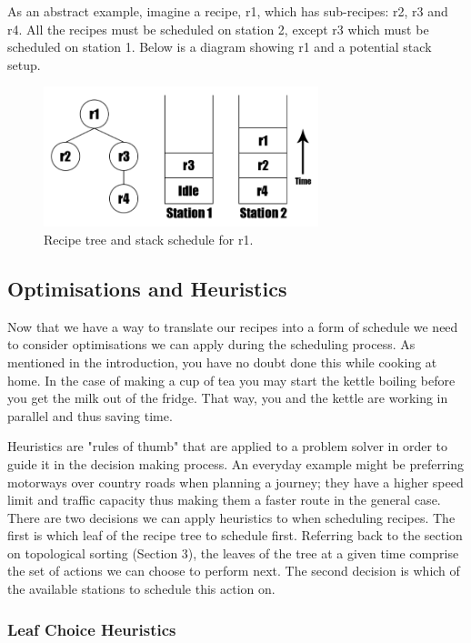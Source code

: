 \documentclass[11pt]{article}
\begin{document}
\medbreak

As an abstract example, imagine a recipe, r1, which has sub-recipes: r2, r3 and r4. All the
recipes must be scheduled on station 2, except r3 which must be scheduled on station 1.
Below is a diagram showing r1 and a potential stack setup.

\begin{figure}[h]
\includegraphics[width=8cm, keepaspectratio]{stacks.png}
\centering
\caption{Recipe tree and stack schedule for r1.}
\end{figure}

\subsection{Optimisations and Heuristics}

Now that we have a way to translate our recipes into a form of schedule we need to consider
optimisations we can apply during the scheduling process. As mentioned in the introduction,
you have no doubt done this while cooking at home. In the case of making a cup of tea you
may start the kettle boiling before you get the milk out of the fridge. That way, you and
the kettle are working in parallel and thus saving time.

\medbreak

Heuristics are "rules of thumb" that are applied to a problem solver in order to guide it
in the decision making process. An everyday example might be preferring motorways over country roads
when planning a journey; they have a higher speed limit and traffic capacity thus making
them a faster route in the general case. There are two decisions we can apply heuristics to
when scheduling recipes. The first is which leaf of the recipe tree to schedule first.
Referring back to the section on topological sorting (Section 3), the leaves of the tree at a given time
comprise the set of actions we can choose to perform next. The second decision is which
of the available stations to schedule this action on.

\subsubsection{Leaf Choice Heuristics}
\end{document}
